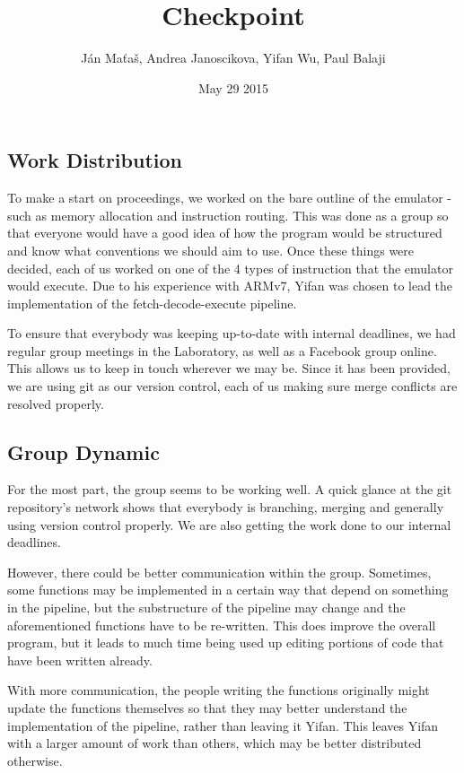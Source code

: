 \documentclass[11pt]{article}
\title{Checkpoint}
\author{Ján Maťaš, Andrea Janoscikova, Yifan Wu, Paul Balaji}
\date{May 29 2015}
\begin{document}
\maketitle

\subsection*{Work Distribution}
To make a start on proceedings, we worked on the bare outline of the emulator - such as memory allocation and instruction routing. This was done as a group so that everyone would have a good idea of how the program would be structured and know what conventions we should aim to use. Once these things were decided, each of us worked on one of the 4 types of instruction that the emulator would execute. Due to his experience with ARMv7, Yifan was chosen to lead the implementation of the fetch-decode-execute pipeline.

To ensure that everybody was keeping up-to-date with internal deadlines, we had regular group meetings in the Laboratory, as well as a Facebook group online. This allows us to keep in touch wherever we may be. Since it has been provided, we are using git as our version control, each of us making sure merge conflicts are resolved properly.

\subsection*{Group Dynamic}
For the most part, the group seems to be working well. A quick glance at the git repository's network shows that everybody is branching, merging and generally using version control properly. We are also getting the work done to our internal deadlines.

However, there could be better communication within the group. Sometimes, some functions may be implemented in a certain way that depend on something in the pipeline, but the substructure of the pipeline may change and the aforementioned functions have to be re-written. This does improve the overall program, but it leads to much time being used up editing portions of code that have been written already.

With more communication, the people writing the functions originally might update the functions themselves so that they may better understand the implementation of the pipeline, rather than leaving it Yifan. This leaves Yifan with a larger amount of work than others, which may be better distributed otherwise.
\end{document}
